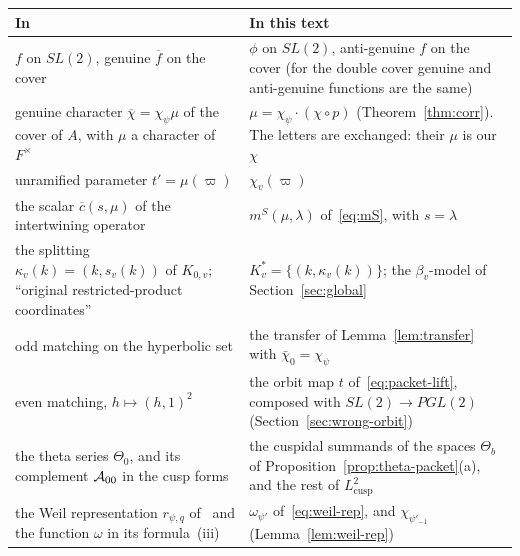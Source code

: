 \begin{center}
\renewcommand{\arraystretch}{1.15}
\begin{tabular}{p{}p{}}
In~\cite{JC26} & In this text\\\hline
$f$ on $SL(2)$, genuine $\overline f$ on the cover & $\phi$ on $SL(2)$,
  anti-genuine $f$ on the cover (for the double cover genuine and
  anti-genuine functions are the same)\\
genuine character $\overline\chi=\chi_\psi\mu$ of the cover of $A$, with
  $\mu$ a character of $F^\times$ & $\mu=\chi_\psi\cdot(\chi\circ p)$
  (Theorem~\ref{thm:corr}). The letters are exchanged: their $\mu$ is our
  $\chi$\\
unramified parameter $t'=\mu(\varpi)$ & $\chi_v(\varpi)$\\
the scalar $\overline c(s,\mu)$ of the intertwining operator &
  $m^S(\mu,\lambda)$ of~\eqref{eq:mS}, with $s=\lambda$\\
the splitting $\kappa_v(k)=(k,s_v(k))$ of $K_{0,v}$; ``original
  restricted-product coordinates'' & $K_v^*=\{(k,\kappa_v(k))\}$; the
  $\beta_v$-model of Section~\ref{sec:global}\\
odd matching on the hyperbolic set & the transfer of
  Lemma~\ref{lem:transfer} with $\bar\chi_0=\chi_\psi$\\
even matching, $h\mapsto(h,1)^2$ & the orbit map $t$
  of~\eqref{eq:packet-lift}, composed with $SL(2)\to PGL(2)$
  (Section~\ref{sec:wrong-orbit})\\
the theta series $\Theta_0$, and its complement ${\cal A}_{00}$ in the
  cusp forms & the cuspidal summands of the spaces $\Theta_b$ of
  Proposition~\ref{prop:theta-packet}(a), and the rest of
  $L^2_{\mathrm{cusp}}$\\
the Weil representation $r_{\psi,q}$ of~\cite{Fl80} and the function
  $\omega$ in its formula~(iii) & $\omega_{\psi'}$
  of~\eqref{eq:weil-rep}, and $\chi_{\psi'_{-1}}$
  (Lemma~\ref{lem:weil-rep})
\end{tabular}
\end{center}

